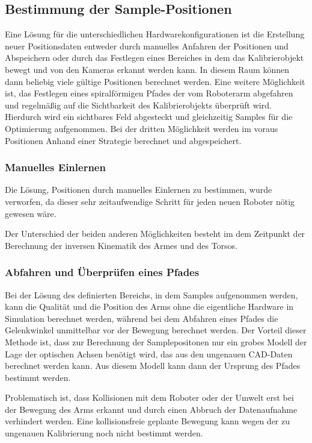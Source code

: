 \subsection{Bestimmung der Sample-Positionen}
\label{sub:Bestimmung der Sample-Positionen}

Eine Lösung für die unterschiedlichen Hardwarekonfigurationen ist die Erstellung
neuer Positionsdaten entweder durch manuelles Anfahren der Positionen und 
Abspeichern oder durch das Festlegen eines Bereiches in dem das Kalibrierobjekt
bewegt und von den Kameras erkannt werden kann. In diesem Raum können dann
beliebig viele gültige Positionen berechnet werden. Eine weitere Möglichkeit
ist, das Festlegen eines spiralförmigen Pfades der vom Roboterarm abgefahren 
und regelmäßig auf die Sichtbarkeit des Kalibrierobjekts überprüft wird. Hierdurch
wird ein sichtbares Feld abgesteckt und gleichzeitig Samples für die 
Optimierung aufgenommen. Bei der dritten Möglichkeit werden im voraus Positionen
Anhand einer Strategie berechnet und abgespeichert.

\subsubsection{Manuelles Einlernen}
\label{ssub:Manuelles Einlernen}
Die Lösung, Positionen durch manuelles Einlernen zu bestimmen, wurde verworfen,
da dieser sehr zeitaufwendige Schritt für jeden neuen Roboter nötig gewesen wäre.

Der Unterschied der beiden anderen Möglichkeiten besteht im dem Zeitpunkt der 
Berechnung der inversen Kinematik des Armes und des Torsos.

\subsubsection{Abfahren und Überprüfen eines Pfades}
\label{ssub:Abfahren und Überprüfen eines Pfades}

Bei der Lösung des 
definierten Bereichs, in dem Samples aufgenommen werden, kann die Qualität und die
Position des Arms ohne die eigentliche Hardware in Simulation berechnet werden, 
während bei dem Abfahren eines Pfades die Gelenkwinkel unmittelbar vor der 
Bewegung berechnet werden. Der Vorteil dieser Methode ist, dass zur Berechnung
der Samplepositonen nur ein grobes Modell der Lage der optischen Achsen benötigt
wird, das aus den ungenauen CAD-Daten berechnet werden kann. Aus diesem Modell
kann dann der Ursprung des Pfades bestimmt werden. 

Problematisch ist, dass Kollisionen mit dem Roboter oder der Umwelt erst bei
der Bewegung des Arms erkannt und durch einen Abbruch der Datenaufnahme 
verhindert werden. Eine kollisionsfreie geplante Bewegung kann wegen der zu 
ungenauen Kalibrierung noch nicht bestimmt werden.

